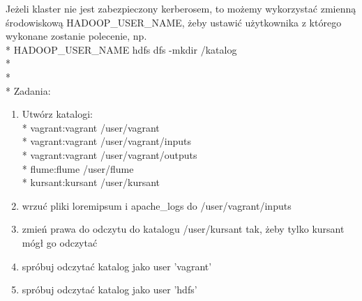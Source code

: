 \documentclass[11pt]{article}
\begin{document}
Jeżeli klaster nie jest zabezpieczony kerberosem, to możemy wykorzystać zmienną środowiskową HADOOP\_USER\_NAME, żeby ustawić użytkownika z którego wykonane zostanie polecenie, np.\\*
HADOOP\_USER\_NAME hdfs dfs -mkdir /katalog
\\*
\\*
\\*
Zadania:
\begin{enumerate}
\item Utwórz katalogi:\\*
vagrant:vagrant /user/vagrant
\\*
vagrant:vagrant /user/vagrant/inputs
\\*
vagrant:vagrant /user/vagrant/outputs
\\*
flume:flume /user/flume
\\*
kursant:kursant /user/kursant
\item wrzuć pliki loremipsum i apache\_logs do /user/vagrant/inputs
\item zmień prawa do odczytu do katalogu /user/kursant tak, żeby tylko kursant mógł go odczytać
\item spróbuj odczytać katalog jako user ’vagrant’
\item spróbuj odczytać katalog jako user ’hdfs’
\end{enumerate}
\end{document}
